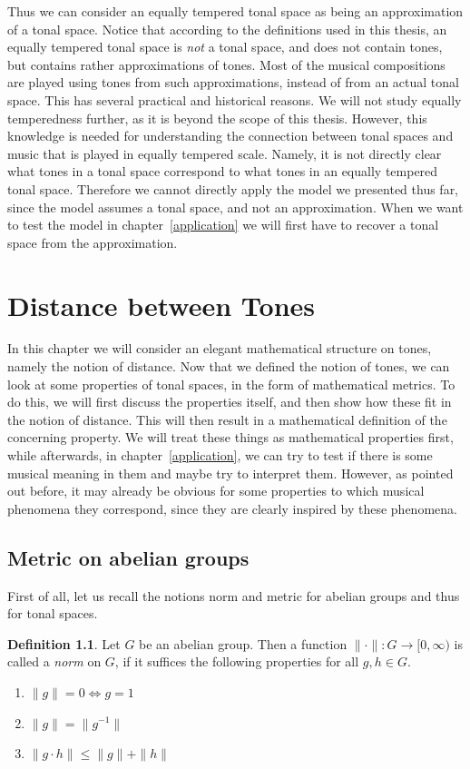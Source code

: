 \documentclass[a4paper]{book}
\theoremstyle{definition}
\newtheorem{definition}[theorem]{Definition}
\begin{document}
Thus we can consider an equally tempered tonal space as being an approximation of a tonal space.
Notice that according to the definitions used in this thesis, an equally tempered tonal space is \emph{not} a tonal space, and does not contain tones, but contains rather approximations of tones.
Most of the musical compositions are played using tones from such approximations, instead of from an actual tonal space.
This has several practical and historical reasons.
We will not study equally temperedness further, as it is beyond the scope of this thesis.
However, this knowledge is needed for understanding the connection between tonal spaces and music that is played in equally tempered scale.
Namely, it is not directly clear what tones in a tonal space correspond to what tones in an equally tempered tonal space.
Therefore we cannot directly apply the model we presented thus far, since the model assumes a tonal space, and not an approximation.
When we want to test the model in chapter~\ref{application} we will first have to recover a tonal space from the approximation.




\chapter{Distance between Tones}
\label{distance}
In this chapter we will consider an elegant mathematical structure on tones, namely the notion of distance.
Now that we defined the notion of tones, we can look at some properties of tonal spaces, in the form of mathematical metrics.
To do this, we will first discuss the properties itself, and then show how these fit in the notion of distance.
This will then result in a mathematical definition of the concerning property.
We will treat these things as mathematical properties first, while afterwards, in chapter~\ref{application}, we can try to test if there is some musical meaning in them and maybe try to interpret them.
However, as pointed out before, it may already be obvious for some properties to which musical phenomena they correspond, since they are clearly inspired by these phenomena.

\section{Metric on abelian groups}

First of all, let us recall the notions norm and metric for abelian groups and thus for tonal spaces.

\begin{definition}
    Let $G$ be an abelian group.
    Then a function $\|\cdot\|:G \to [0,\infty)$ is called a \emph{norm} on $G$, if it suffices the following properties for all $g,h \in G$.
	\begin{enumerate}[i]
		\item $\|g\| = 0 \Leftrightarrow g=1$
        \item $\|g\| = \|g^{-1}\|$
		\item $\|g \cdot h\| \leq \|g\| + \|h\|$
	\end{enumerate}
\end{definition}
\end{document}

